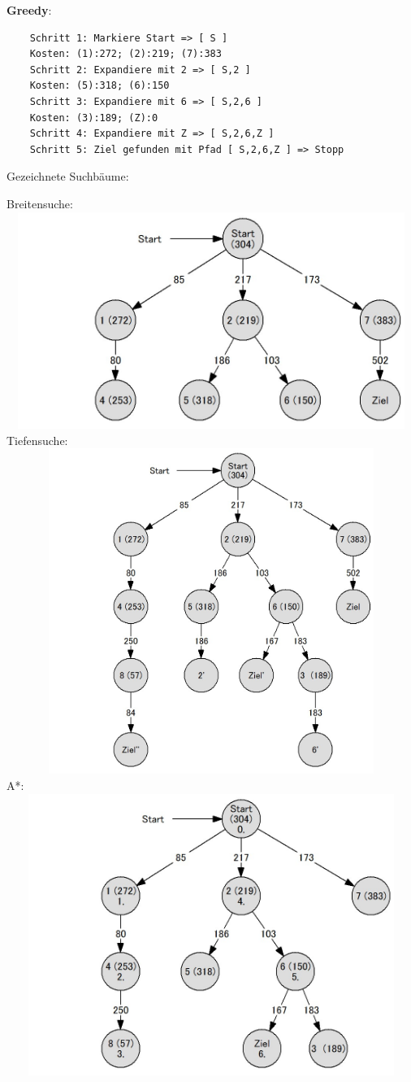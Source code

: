 \documentclass[
  a4paper,
  11pt,
]{scrartcl}
\begin{document}
\textbf{Greedy}:

\begin{verbatim}
	Schritt 1: Markiere Start => [ S ]
	Kosten: (1):272; (2):219; (7):383
	Schritt 2: Expandiere mit 2 => [ S,2 ]
	Kosten: (5):318; (6):150
	Schritt 3: Expandiere mit 6 => [ S,2,6 ]
	Kosten: (3):189; (Z):0
	Schritt 4: Expandiere mit Z => [ S,2,6,Z ]
	Schritt 5: Ziel gefunden mit Pfad [ S,2,6,Z ] => Stopp
\end{verbatim}
\newpage
Gezeichnete Suchbäume:

Breitensuche:
\includegraphics*[width=400pt,height=200pt]{img/bfs.jpg}\\
Tiefensuche:
\includegraphics*[width=400pt,height=300pt]{img/dfs.jpg}\\
A*:
\includegraphics*[width=400pt,height=260pt]{img/astar.jpg}\\
\end{document}
